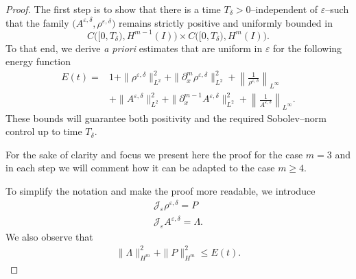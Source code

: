 \documentclass[12pt]{amsart}
\newcommand{\Jrho}{\mathcal{J_\varepsilon}\rho^{\varepsilon,\delta}}
\newcommand{\JA}{\mathcal{J_\varepsilon}A^{\varepsilon,\delta}}
\begin{document}
		\begin{proof}
        The first step is to show that there is a time $T_\delta>0$--independent of $\varepsilon$--such that the family $\bigl(A^{\varepsilon,\delta},\rho^{\varepsilon,\delta}\bigr)$ remains strictly positive and uniformly bounded in
$$
C\bigl([0,T_\delta),H^{m-1}(I)\bigr)\times C\bigl([0,T_\delta),H^m(I)\bigr).
$$
To that end, we derive \emph{a priori}  estimates that are uniform in $\varepsilon$ for the following energy function
        \[
        \begin{split}
            E(t)=& 1+\|\rho^{\varepsilon,\delta}\|_{L^2}^2+\|\partial_{x}^{m}\rho^{\varepsilon,\delta}\|_{L^2}^2+\left\| \frac{1}{\rho^{\varepsilon,\delta}}\right\|_{L^\infty} \\&+ \|A^{\varepsilon,\delta}\|_{L^2}^2+\|\partial_x^{m-1}A^{\varepsilon,\delta}\|_{L^2}^2+\left\| \frac{1}{A^{\varepsilon,\delta}}\right\|_{L^\infty}.
        \end{split}
        \]
        These bounds will guarantee both positivity and the required Sobolev--norm control up to time $T_\delta$.


        For the sake of clarity and
        focus we present here the proof for the case $m=3$ and  in each step we will comment how it can be adapted to the case $m\geq 4$.

       To simplify the notation and make the proof more readable, we introduce
        \begin{equation*}
            \begin{split}
                \Jrho=P\\
                \JA=\Lambda.
            \end{split}
        \end{equation*}
        We also observe that
        \begin{equation*}
            \begin{split}
                 \|\Lambda\|_{H^m}^2+\|P\|_{H^m}^2\leq E(t).
            \end{split}
        \end{equation*}
        


\end{proof}
\end{document}
